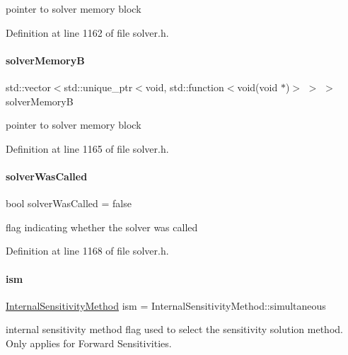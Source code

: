 pointer to solver memory block 

Definition at line 1162 of file solver.\+h.

\mbox{\label{classamici_1_1_solver_af450f49c134cba233622f7d07fc78c06}} 
\paragraph{\texorpdfstring{solverMemoryB}{solverMemoryB}}
{\footnotesize\ttfamily std\+::vector$<$std\+::unique\+\_\+ptr$<$void, std\+::function$<$void(void $\ast$)$>$ $>$ $>$ solver\+MemoryB\hspace{0.3cm}{\ttfamily [protected]}}

pointer to solver memory block 

Definition at line 1165 of file solver.\+h.

\mbox{\label{classamici_1_1_solver_a454f49f72b43a33add909d7ac630ce1c}} 
\paragraph{\texorpdfstring{solverWasCalled}{solverWasCalled}}
{\footnotesize\ttfamily bool solver\+Was\+Called = false\hspace{0.3cm}{\ttfamily [protected]}}

flag indicating whether the solver was called 

Definition at line 1168 of file solver.\+h.

\mbox{\label{classamici_1_1_solver_a5b3b5ca18d3932765358bdf278290861}} 
\paragraph{\texorpdfstring{ism}{ism}}
{\footnotesize\ttfamily \mbox{\hyperlink{namespaceamici_aa444c52f0a5638d68702d1ec92f8db87}{Internal\+Sensitivity\+Method}} ism = Internal\+Sensitivity\+Method\+::simultaneous\hspace{0.3cm}{\ttfamily [protected]}}

internal sensitivity method flag used to select the sensitivity solution method. Only applies for Forward Sensitivities. 

